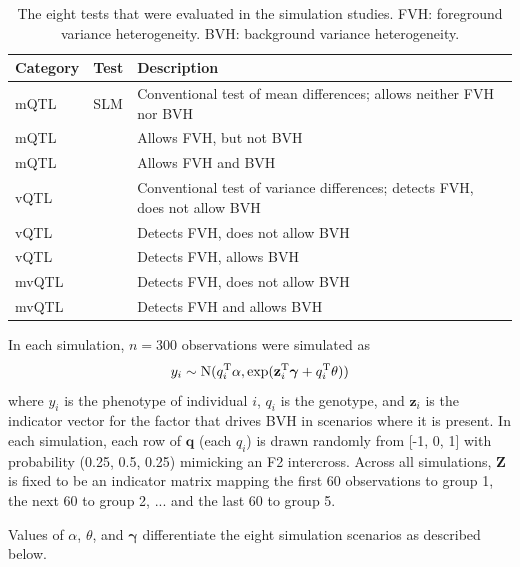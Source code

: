 \begin{table}
    \begin{tabular}{l|l|p{8cm}}
    \hline
     \textbf{Category} & \textbf{Test} & \textbf{Description} \\
    \hline
    mQTL        & SLM       & Conventional test of mean differences; allows neither FVH nor BVH \\
    mQTL        & \Caom{}   & Allows FVH, but not BVH \\
    mQTL        & \DGLMm{}  & Allows FVH and BVH \\
    \hline
    vQTL        & \Lev{}    & Conventional test of variance differences; detects FVH, does not allow BVH \\
    vQTL        & \Caov{}   & Detects FVH, does not allow BVH \\
    vQTL        & \DGLMv{}  & Detects FVH, allows BVH \\
    \hline
    mvQTL       & \Caomv{}  & Detects FVH, does not allow BVH \\
    mvQTL       & \DGLMmv{} & Detects FVH and allows BVH \\
    \hline
    \end{tabular}
    \caption[
      The eight tests that were evaluated in the simulation studies.
    ]
    {
      The eight tests that were evaluated in the simulation studies. FVH: foreground variance heterogeneity. BVH: background variance heterogeneity.
    }
    \label{tab:tests}
\end{table}

In each simulation, $n = 300$ observations were simulated as
\[
    y_i \sim \mathrm{N}(q_i^\mathrm{T} \alpha, \exp(\mathbf{z}_i^\mathrm{T}\bm{\gamma} + q_i^\mathrm{T} \theta))
\]
where $y_i$ is the phenotype of individual $i$,
    ${q_i}$ is the genotype,
    and $\mathbf{z}_i$ is the indicator vector for the factor that drives BVH in scenarios where it is present.
    In each simulation, each row of $\mathbf{q}$ (each ${q}_i$) is drawn randomly from [-1, 0, 1] with probability (0.25, 0.5, 0.25) mimicking an F2 intercross.
    Across all simulations, $\bm{Z}$ is fixed to be an indicator matrix mapping the first 60 observations to group 1, the next 60 to group 2, ... and the last 60 to group 5.

Values of $\alpha$, $\theta$, and $\bm{\gamma}$ differentiate the eight simulation scenarios as described below.

